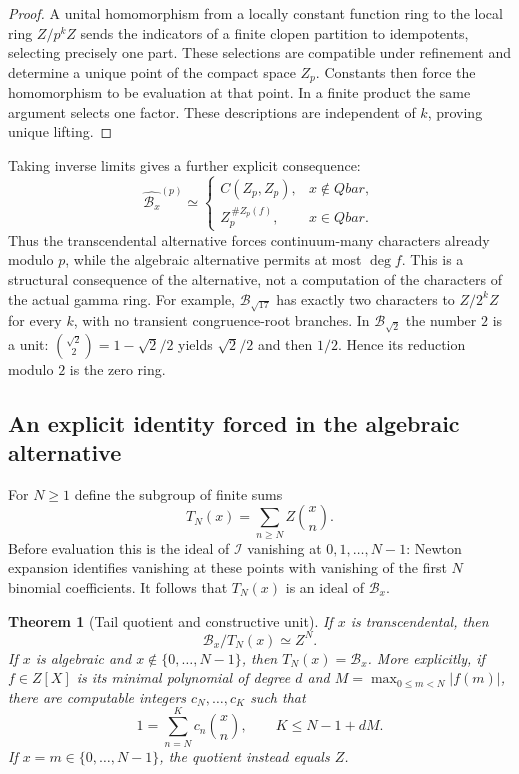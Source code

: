 \documentclass[11pt,a4paper]{article}
\newcommand{\Z}{\mathbb Z}
\newcommand{\QB}{\overline{\mathbb Q}}
\newcommand{\Qbar}{\overline{\mathbb Q}}
\newtheorem{theorem}{Theorem}[section]
\theoremstyle{definition}
\theoremstyle{remark}
\theoremstyle{plain}
\numberwithin{equation}{section}
\def\Qbar{Qbar}\def\QB{Qbar}\def\mathbb#1{#1}%
\begin{document}
\begin{proof}
A unital homomorphism from a locally constant function ring to
the local ring $\Z/p^k\Z$ sends the indicators of a finite
clopen partition to idempotents, selecting precisely one part.
These selections are compatible under refinement and determine
a unique point of the compact space $\Z_p$.  Constants then
force the homomorphism to be evaluation at that point.  In a
finite product the same argument selects one factor.  These
descriptions are independent of $k$, proving unique lifting.
\end{proof}

Taking inverse limits gives a further explicit consequence:
\[
 \widehat{\mathcal B_x}^{(p)}\simeq
 \begin{cases}
 C(\Z_p,\Z_p),&x\notin\Qbar,\\
 \Z_p^{\,\#Z_p(f)},&x\in\Qbar.
 \end{cases}
\]
Thus the transcendental alternative forces continuum-many characters
already modulo $p$, while the algebraic alternative permits at most
$\deg f$.  This is a structural consequence of the alternative,
not a computation of the characters of the actual gamma ring.
For example, $\mathcal B_{\sqrt{17}}$ has exactly two characters
to $\Z/2^k\Z$ for every $k$, with no transient congruence-root
branches.  In $\mathcal B_{\sqrt2}$ the number $2$ is a unit:
$\binom{\sqrt2}{2}=1-\sqrt2/2$ yields $\sqrt2/2$ and then
$1/2$.  Hence its reduction modulo $2$ is the zero ring.

\subsection{An explicit identity forced in the algebraic alternative}

For $N\ge1$ define the subgroup of finite sums
\[
 T_N(x)=\sum_{n\ge N}\Z\binom xn.
\]
Before evaluation this is the ideal of $\mathcal I$ vanishing at
$0,1,\ldots,N-1$: Newton expansion identifies vanishing at these
points with vanishing of the first $N$ binomial coefficients.
It follows that $T_N(x)$ is an ideal of $\mathcal B_x$.

\begin{theorem}[Tail quotient and constructive unit]
\label{ra:bin:thm:tail}
If $x$ is transcendental, then
\[
 \mathcal B_x/T_N(x)\simeq\Z^N.
\]
If $x$ is algebraic and $x\notin\{0,\ldots,N-1\}$, then
$T_N(x)=\mathcal B_x$.  More explicitly, if $f\in\Z[X]$
is its minimal polynomial of degree $d$ and
$M=\max_{0\le m<N}|f(m)|$, there are computable integers
$c_N,\ldots,c_K$ such that
\[
 1=\sum_{n=N}^Kc_n\binom xn,
 \qquad K\le N-1+dM.
\]
If $x=m\in\{0,\ldots,N-1\}$, the quotient instead equals $\Z$.
\end{theorem}
\end{document}
